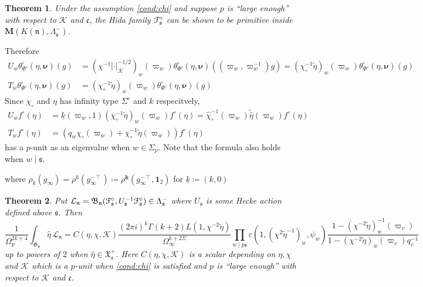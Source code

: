 \documentclass[leqno]{amsart}
\newcommand{\K}{{\mathcal{K}}} %
\newcommand{\id}{\mathbf{1}}
\newcommand{\1}{\mathbf{1}}
\newcommand{\fc}{\mathfrak c}
\newcommand{\B}{\mathfrak B}
\newcommand{\fs}{\mathfrak s}
\newcommand{\fn}{\mathfrak n}
\newcommand{\M}{\mathbf{M}}
\newcommand{\bnu}{\boldsymbol{\nu}}
\newcommand{\wt}[1]{\underline{ #1 }}
\newcommand{\bwt}[1]{\underline{\boldsymbol { #1 }}}
\newcommand{\fG}{\mathfrak{G}}
\newcommand{\fX}{\mathfrak{X}}
\newcommand{\euF}{\EuScript{F}}
\newtheorem{thm}{Theorem}[section]
\theoremstyle{definition}
\theoremstyle{remark}
\begin{document}
\begin{thm}\label{thm:intro1}
    Under the assumption \eqref{cond:chi}
    and suppose $p$ is ``large enough'' with respect to $\K$ and $\fc$,
    the Hida family $\euF^\circ_{\fs}$
    can be shown to be primitive inside $\M(K(\fn),\Lambda_{\fs}^-)$.
\end{thm}

Therefore
\begin{align*}
    U_w\theta^\square_{\Phi'}(\eta,\bnu)(g)&=
    (\chi^{-1}|\cdot|_\K^{-1/2})_w(\varpi_w)
    \theta^\square_{\Phi'}(\eta,\bnu)((\varpi_w,\varpi_w^{-1})g)
    =(\chi_\circ^{-1}\tilde{\eta})_w(\varpi_w)
    \theta^\square_{\Phi'}(\eta,\bnu)(g)\\
    T_w\theta^\square_{\Phi'}(\eta,\bnu)(g)&=
    (\chi_\circ^{-1}\tilde{\eta})_w(\varpi_w)
    \theta^\square_{\Phi'}(\eta,\bnu)(g)
\end{align*}
Since $\chi_\circ$ and $\eta$ has infinity type $\Sigma^c$ and $k$ respecitvely,
\begin{align}
    U_wf^\circ(\eta)&=
    \wt{k}(\varpi_w,1)
    (\chi_\circ^{-1}\tilde{\eta})_w(\varpi_w)f^\circ(\eta)=
    \hat{\chi}_\circ^{-1}(\varpi_w)\tilde{\hat{\eta}}(\varpi_w)f^\circ(\eta)\\
    T_wf^\circ(\eta)&=
    (q_w\chi_\circ(\varpi_w)
    +\chi_\circ^{-1}\tilde{\eta}(\varpi_w))
    f^\circ(\eta)
\end{align}
has a $p$-unit as an eigenvalue when $w\in \Sigma_p$.
Note that the formula also holds when $w\mid \fs$.


where $\rho_{\wt{k}}(g_\infty)=\rho^{\wt{k}}(g_\infty^{-\intercal})
\coloneqq \rho^{\bwt{k}}(g_\infty^{-\intercal},\id_2)$
for $\wt{k}\coloneqq (k,0)$



\begin{thm}\label{thm:intro2}
    Put $\mathcal{L}_\fn=\B_\fn(\euF^\circ_{\fs},U_\fs^{-1}\euF^\circ_{\fs})
    \in \Lambda_{\fs}^-$
    where $U_\fs$ is some Hecke action defined above $\fs$. Then
    \begin{equation*}
        \frac{1}{\Omega_p^{2k+4}}
        \int_{\fG_{\fn}}\hat{\eta}\,\mathcal{L}_\fn=
    C(\eta,\chi,\K)
    \frac{(2\pi i)^{k}\Gamma(k+2)L(1,\chi^{-2}\tilde{\eta})}{\Omega_\infty^{k+2\Sigma}}
    \prod_{w\mid p\fs}
    \varepsilon(1,(\chi^{2}\tilde{\eta}^{-1})_w,\psi_w)
    \frac{1-(\chi^{-2}\tilde{\eta})^{-1}_w(\varpi_v)}
    {1-(\chi^{-2}\tilde{\eta})_w(\varpi_v)q_v^{-1}}
    \end{equation*}
    up to powers of $2$
    when $\hat{\eta}\in \fX^+_{\fs}$.
    Here $C(\eta,\chi,\K)$ is a scalar depending on $\eta,\chi$ and $\K$
    which is a $p$-unit when \eqref{cond:chi} is satisfied 
    and $p$ is ``large enough''
    with respect to $\K$ and $\fc$. 
\end{thm}
\end{document}
